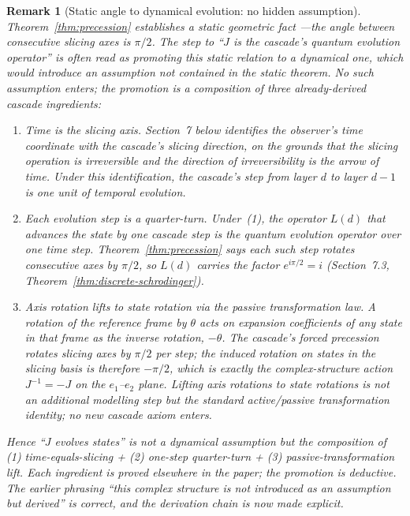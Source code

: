 \documentclass[12pt,a4paper]{article}
\newtheorem{remark}[theorem]{Remark}
\begin{document}
\begin{remark}[Static angle to dynamical evolution: no hidden assumption]\label{rem:sp16-status}
Theorem~\ref{thm:precession} establishes a \emph{static} geometric fact
---the angle between consecutive slicing axes is $\pi/2$. The step to
``$J$ is the cascade's quantum evolution operator'' is often read as
promoting this static relation to a dynamical one, which would
introduce an assumption not contained in the static theorem. No such
assumption enters; the promotion is a composition of three
already-derived cascade ingredients:
\begin{enumerate}
\item \emph{Time is the slicing axis.} Section~7 below identifies the
observer's time coordinate with the cascade's slicing direction, on
the grounds that the slicing operation is irreversible and the
direction of irreversibility is the arrow of time. Under this
identification, the cascade's step from layer $d$ to layer $d-1$ is
one unit of temporal evolution.
\item \emph{Each evolution step is a quarter-turn.} Under~(1),
the operator $L(d)$ that advances the state by one cascade step
\emph{is} the quantum evolution operator over one time step.
Theorem~\ref{thm:precession} says each such step rotates consecutive
axes by $\pi/2$, so $L(d)$ carries the factor $e^{i\pi/2}=i$
(Section~7.3, Theorem~\ref{thm:discrete-schrodinger}).
\item \emph{Axis rotation lifts to state rotation via the passive
transformation law.} A rotation of the reference frame by $\theta$
acts on expansion coefficients of any state in that frame as the
inverse rotation, $-\theta$. The cascade's forced precession
rotates slicing axes by $\pi/2$ per step; the induced rotation on
states in the slicing basis is therefore $-\pi/2$, which is exactly
the complex-structure action $J^{-1}=-J$ on the $e_1$--$e_2$
plane. Lifting axis rotations to state rotations is not an
additional modelling step but the standard active/passive
transformation identity; no new cascade axiom enters.
\end{enumerate}
Hence ``$J$ evolves states'' is not a dynamical assumption but the
composition of (1) time-equals-slicing + (2) one-step quarter-turn +
(3) passive-transformation lift. Each ingredient is proved elsewhere
in the paper; the promotion is deductive. The earlier phrasing
``this complex structure is not introduced as an assumption but
derived'' is correct, and the derivation chain is now made
explicit.
\end{remark}
\end{document}
